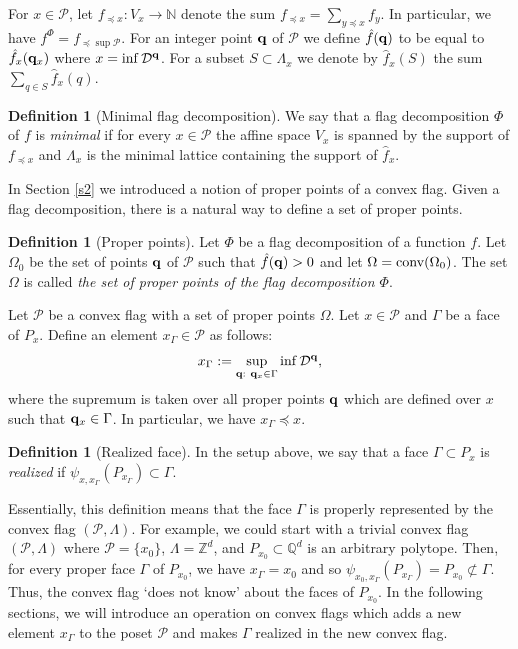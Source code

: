 \documentclass{daj}
\newcommand{\Q}{\mathbb Q}
\newcommand{\Z}{\mathbb Z}
\newcommand{\N}{\mathbb N}
\newcommand{\D}{\mathcal D}
\renewcommand{\P}{\mathcal P}
\renewcommand{\c}{\mbox{\rm conv}}
\theoremstyle{definition}
\newtheorem{defi}[theorem]{Definition}
\theoremstyle{remark}
\theoremstyle{definition}
\theoremstyle{definition}
\begin{document}
For $x \in \P$, let $f_{\preceq x}: V_x \rightarrow \N$ denote the sum $f_{\preceq x} = \sum_{y \preceq x} f_y$. In particular, we have $f^\Phi = f_{\preceq \sup \P}$.
For an integer point ${\bf q}$ of $\P$ we define $\hat f({\bf q})$ to be equal to $\hat f_x({\bf q}_x)$ where $x = \inf \D^{\bf q}$. For a subset $S \subset \Lambda_x$ we denote by $\hat f_x(S)$ the sum $\sum_{q \in S} \hat f_x(q)$. 

\begin{defi}[Minimal flag decomposition]
We say that a flag decomposition $\Phi$ of $f$ is {\em minimal} if for every $x \in \P$ the affine space $V_x$ is spanned by the support of $f_{\preceq x}$ and $\Lambda_x$ is the minimal lattice containing the support of $\hat f_x$.    
\end{defi}


In Section \ref{s2} we introduced a notion of proper points of a convex flag. Given a flag decomposition, there is a natural way to define a set of proper points.

\begin{defi}[Proper points]\label{prop}
Let $\Phi$ be a flag decomposition of a function $f$. Let $\Omega_0$ be the set of points ${\bf q}$ of $\P$ such that $\hat f({\bf q}) > 0$ and let $\Omega = \c (\Omega_0)$. The set $\Omega$ is called {\em the set of proper points of the flag decomposition $\Phi$}.
\end{defi}


Let $\P$ be a convex flag with a set of proper points $\Omega$. 
Let $x \in \P$ and $\Gamma$ be a face of $P_x$. Define an element $x_\Gamma \in \P$ as follows:
\begin{equation}\label{formula}
    x_{\Gamma} := \sup_{{\bf q}: ~{\bf q}_x \in \Gamma} \inf \D^{\bf q},
\end{equation}
where the supremum is taken over all proper points ${\bf q}$ which are defined over $x$ such that ${\bf q}_x \in \Gamma$. In particular, we have $x_\Gamma \preceq x$.

\begin{defi}[Realized face]
    In the setup above, we say that a face $\Gamma \subset P_x$ is {\em realized} if $ \psi_{x, x_\Gamma} (P_{x_\Gamma}) \subset \Gamma$.
\end{defi}

Essentially, this definition means that the face $\Gamma$ is properly represented by the convex flag $(\P, \Lambda)$. For example, we could start with a trivial convex flag $(\P,\Lambda)$ where $\P = \{x_0\}$, $\Lambda=\Z^d$, and $P_{x_0} \subset \Q^d$ is an arbitrary polytope. Then, for every proper face $\Gamma$ of $P_{x_0}$, we have $x_\Gamma = x_0$ and so $\psi_{x_0, x_\Gamma}(P_{x_\Gamma}) = P_{x_0} \not\subset \Gamma$. Thus, the convex flag `does not know' about the faces of $P_{x_0}$. In the following sections, we will introduce an operation on convex flags which adds a new element $x_\Gamma$ to the poset $\P$ and makes $\Gamma$ realized in the new convex flag. 
\end{document}
